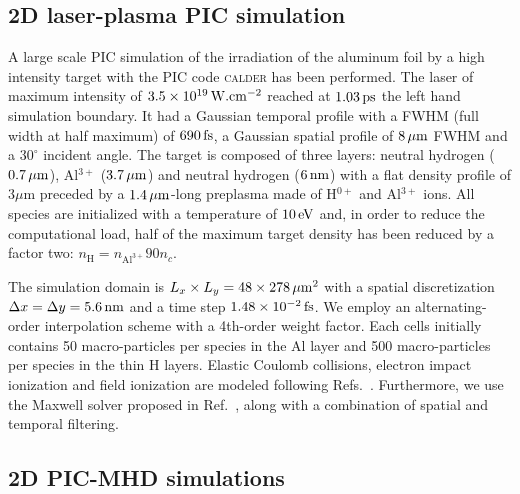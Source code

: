 \documentclass[aps,twocolumn,showpacs,superscriptaddress]{revtex4}
\begin{document}
\subsection*{2D laser-plasma PIC simulation}

A large scale PIC simulation of the irradiation of the aluminum foil by a high intensity target with the PIC code \textsc{calder} has been performed.
The laser of maximum intensity of $3.5 \times 10^{19}\,\rm W.cm^{-2}$ reached at $1.03\,\rm ps$ the left hand simulation boundary. It had a Gaussian temporal profile with a FWHM (full width at half maximum) of $690\,\rm fs$,  a Gaussian spatial profile of $8\,\rm \mu m$ FWHM and a $30^\circ$ incident angle. The target is composed of three layers: neutral hydrogen ($0.7\,\rm \mu m$), Al$^{3+}$ ($3.7\,\rm \mu m$) and neutral hydrogen ($6\,\rm nm$) with a flat density profile of $3 \mu$m preceded by a $1.4\,\rm \mu m$-long preplasma made of H$^{0+}$ and Al$^{3+}$ ions. All species are initialized with a temperature of $10\,\rm eV$ and, in order to reduce the computational load, half of the maximum target density has been reduced by a factor two: $n_\mathrm{H} = n_{\mathrm{Al}^{3+}}90 n_c$.

The simulation domain is $L_x\times L_y = 48 \times 278\,\rm \mu m^2$ with a spatial discretization $\Delta x = \Delta y = 5.6\,\rm nm$ and a time step
$1.48\times 10^{-2}\,\rm fs$. We employ an alternating-order interpolation scheme \cite{CPC_Sokolov_2013} with a 4th-order weight factor. Each cells initially contains
50 macro-particles per species in the Al layer and 500 macro-particles per species in the thin H layers. Elastic Coulomb collisions, electron impact
ionization and field ionization are modeled following Refs.~\cite{POP_Perez_2012}. Furthermore, we use the Maxwell solver proposed in Ref.~\cite{PRSTAB_Lehe_2013}, along with a combination of spatial \cite{JCP_Vay_2011} and temporal \cite{JCP_Friedman_1990} filtering.

\subsection*{2D PIC-MHD simulations}
\end{document}
